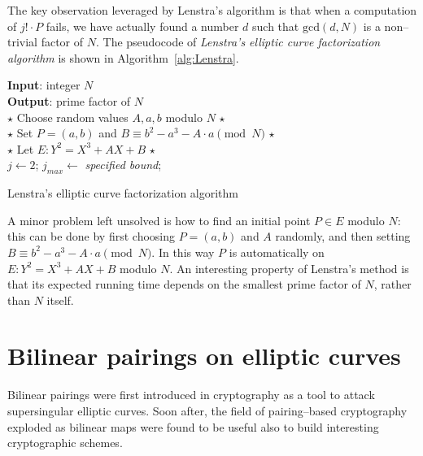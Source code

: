 \documentclass[9pt]{article}
\theoremstyle{definition}
\begin{document}
The key observation leveraged by Lenstra's algorithm is that when a computation of $j!\cdot P$ fails, we have actually found a number $d$ such that $\text{gcd}(d,N)$ is a non--trivial factor of $N$. The pseudocode of \textit{Lenstra's elliptic curve factorization algorithm} is shown in Algorithm~\ref{alg:Lenstra}.

\begin{algorithm}[H]
	\SetAlgoLined
	\textbf{Input}: integer $N$ \\
	\textbf{Output}: prime factor of $N$ \\ 
	$\star$ Choose random values $A,a,b$ modulo $N$ $\star$\\
	$\star$ Set $P = (a,b)$ and $B \equiv b^2 - a^3 - A\cdot a \pmod{N}$ $\star$\\
	$\star$ Let $E: Y^2 = X^3 + AX + B$ $\star$ \\
	$j \gets 2$; $j_{max} \gets $ \textit{specified bound}; \\
	\caption{Lenstra's elliptic curve factorization algorithm}
	\label{alg:Lenstra}
\end{algorithm}

A minor problem left unsolved is how to find an initial point $P \in E$ modulo $N$: this can be done by first choosing $P = (a,b)$ and $A$ randomly, and then setting $B \equiv b^2 - a^3 - A\cdot a \pmod{N}$. In this way $P$ is automatically on $E : Y^2 = X^3 + AX + B$ modulo $N$. An interesting property of Lenstra's method is that its expected running time depends on the smallest prime factor of $N$, rather than $N$ itself.


\clearpage\section{Bilinear pairings on elliptic curves}
Bilinear pairings were first introduced in cryptography as a tool to attack supersingular elliptic curves. Soon after, the field of pairing--based cryptography exploded as bilinear maps were found to be useful also to build interesting cryptographic schemes.
\end{document}
